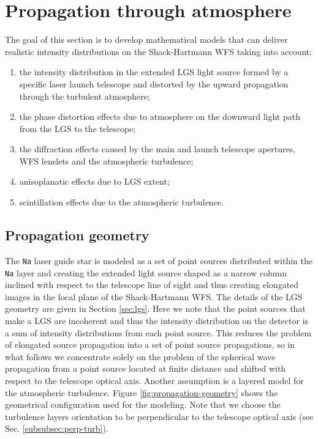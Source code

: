 
\newpage
\section{Propagation through atmosphere}
\label{app:Propagation}

\mbox{}

The goal of this section is to develop mathematical models
that can deliver realistic intensity distributions on the Shack-Hartmann WFS
taking into account:
\begin{enumerate}
  \item the intensity distribution in the extended LGS light source formed by
  a specific laser launch telescope and distorted by the upward propagation
  through the turbulent atmosphere;
  \item the phase distortion effects due to atmosphere on the downward light
  path from the LGS to the telescope;
  \item the diffraction effects caused by the main and launch telescope
  apertures, WFS lenslets and the atmospheric turbulence;
  \item anisoplanatic effects due to LGS extent;
  \item scintillation effects due to the atmospheric turbulence.
\end{enumerate}

\subsection{Propagation geometry}

The \texttt{Na} laser guide star is modeled as a set of point sources
distributed within the \texttt{Na} layer and creating the extended light
source shaped as a narrow column inclined with respect to the telescope line
of sight and thus creating elongated images in the focal plane of the
Shack-Hartmann WFS. The details of the LGS geometry are given in Section
\ref{sec:lgs}. Here we note that the point sources that make a LGS are
incoherent and thus the intensity distribution on the detector is a sum of
intensity distributions from each point source. This reduces the problem of
elongated source propagation into a set of point source propagations, so in
what follows we concentrate solely on the problem of the spherical wave
propagation from a point source located at finite distance and shifted with
respect to the telescope optical axis. Another assumption is a layered model
for the atmospheric turbulence. Figure \ref{fig:propagation-geometry} shows
the geometrical configuration used for the modeling. Note that we choose the
turbulence layers orientation to be perpendicular to the telescope optical
axis (see Sec. \ref{subsubsec:perp-turb}).

